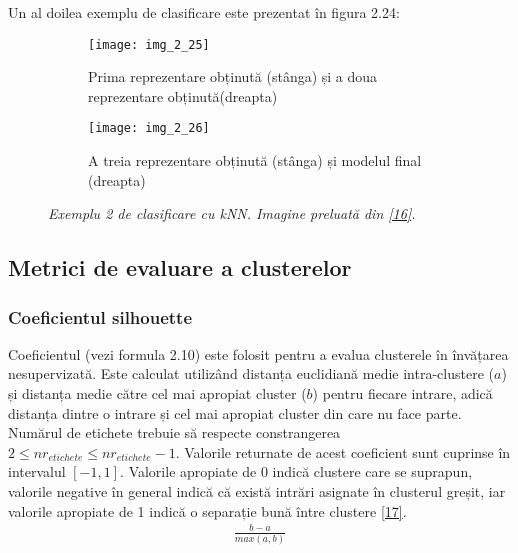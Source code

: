 Un al doilea exemplu de clasificare este prezentat în figura 2.24:
\begin{figure}[!h]
  \begin{subfigure}[b]{0.4\textwidth}
    \texttt{[image: img\_2\_25]}
    \caption{Prima reprezentare obținută (stânga) și a doua reprezentare obținută(dreapta)}
    \label{fig:f1}
  \end{subfigure}
  \hfill
  \begin{subfigure}[b]{0.4\textwidth}
    \texttt{[image: img\_2\_26]}
    \caption{A treia reprezentare obținută (stânga) și modelul final (dreapta)}
    \label{fig:f2}
  \end{subfigure}
  \caption[Exemplu 2 de clasificare cu kNN]{\textit{Exemplu 2 de clasificare cu kNN. Imagine preluată din \hyperlink{gongdeguo}{[16]}.}}
\end{figure}

\subsection{Metrici de evaluare a clusterelor}

\subsubsection{Coeficientul silhouette}

Coeficientul (vezi formula 2.10) este folosit pentru a evalua clusterele în învățarea nesupervizată. Este calculat utilizând distanța euclidiană medie intra-clustere ($a$) și distanța medie către cel mai apropiat cluster ($b$) pentru fiecare intrare, adică distanța dintre o intrare și cel mai apropiat cluster din care nu face parte. Numărul de etichete trebuie să respecte constrangerea $2 \leq nr_{etichete} \leq nr_{etichete} - 1$. Valorile returnate de acest coeficient sunt cuprinse în intervalul $[-1, 1]$. Valorile apropiate de 0 indică clustere care se suprapun, valorile negative în general indică că există intrări asignate în clusterul greșit, iar valorile apropiate de 1 indică o separație bună între clustere \hyperlink{silhouette}{[17]}.
\begin{align}
	\frac{b-a}{max(a,b)}
\end{align}
